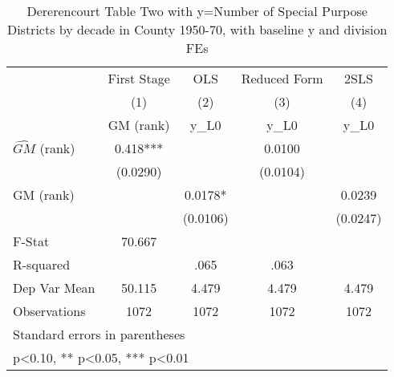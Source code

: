 \begin{table}[htbp]\centering
\def\sym#1{\ifmmode^{#1}\else\(^{#1}\)\fi}
\caption{Dererencourt Table Two with y=Number of Special Purpose Districts by decade in County 1950-70, with baseline y and division FEs}
\begin{tabular}{l*{4}{c}}
\toprule
                    & First Stage   &         OLS   &Reduced Form   &        2SLS   \\
                    &\multicolumn{1}{c}{(1)}&\multicolumn{1}{c}{(2)}&\multicolumn{1}{c}{(3)}&\multicolumn{1}{c}{(4)}\\
                    &\multicolumn{1}{c}{GM  (rank)}&\multicolumn{1}{c}{y\_L0}&\multicolumn{1}{c}{y\_L0}&\multicolumn{1}{c}{y\_L0}\\
\midrule
$\hat{GM}$ (rank)   &       0.418***&               &      0.0100   &               \\
                    &    (0.0290)   &               &    (0.0104)   &               \\
\addlinespace
GM  (rank)          &               &      0.0178*  &               &      0.0239   \\
                    &               &    (0.0106)   &               &    (0.0247)   \\
\midrule
F-Stat              &      70.667   &               &               &               \\
R-squared           &               &        .065   &        .063   &               \\
Dep Var Mean        &      50.115   &       4.479   &       4.479   &       4.479   \\
Observations        &        1072   &        1072   &        1072   &        1072   \\
\bottomrule
\multicolumn{5}{l}{\footnotesize Standard errors in parentheses}\\
\multicolumn{5}{l}{\footnotesize * p<0.10, ** p<0.05, *** p<0.01}\\
\end{tabular}
\end{table}
